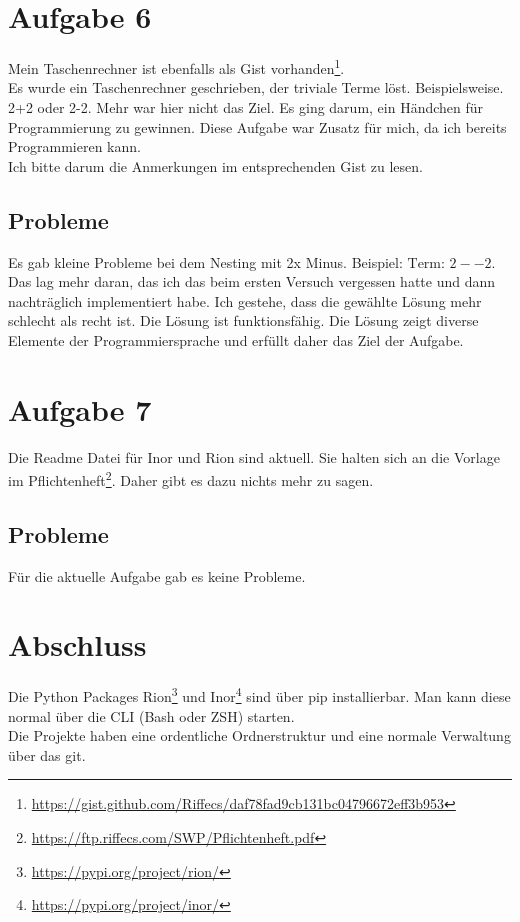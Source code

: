 \documentclass[fleqn,10pt]{olplainarticle}
\begin{document}
\section*{Aufgabe 6}
Mein Taschenrechner ist ebenfalls als Gist vorhanden\footnote{\url{https://gist.github.com/Riffecs/daf78fad9cb131bc04796672eff3b953}}. \\
Es wurde ein Taschenrechner geschrieben, der triviale Terme löst. Beispielsweise. 2+2 oder 2-2. 
Mehr war hier nicht das Ziel. Es ging darum, ein Händchen für Programmierung zu gewinnen. 
Diese Aufgabe war Zusatz für mich, da ich bereits Programmieren kann. \smiley{} \\
Ich bitte darum die Anmerkungen im entsprechenden Gist zu lesen.

\subsection*{Probleme}
Es gab kleine Probleme bei dem Nesting mit 2x Minus. Beispiel: $\text{Term: }2--2$. Das lag mehr daran, das ich das beim ersten Versuch vergessen hatte und dann nachträglich implementiert habe. Ich gestehe, dass die gewählte Lösung mehr schlecht als recht ist. Die Lösung ist funktionsfähig. Die Lösung zeigt diverse Elemente der Programmiersprache und erfüllt daher das Ziel der Aufgabe.

\cleardoublepage
\section*{Aufgabe 7}
Die Readme Datei für Inor und Rion sind aktuell. Sie halten sich an die Vorlage im Pflichtenheft\footnote{\url{https://ftp.riffecs.com/SWP/Pflichtenheft.pdf}}. Daher gibt es dazu nichts mehr zu sagen.

\subsection*{Probleme}
Für die aktuelle Aufgabe gab es keine Probleme.


\section*{Abschluss}
Die Python Packages Rion\footnote{\url{https://pypi.org/project/rion/}} und Inor\footnote{\url{https://pypi.org/project/inor/}} sind über pip installierbar. Man kann diese normal über die CLI (Bash oder ZSH) starten.\\
Die Projekte haben eine ordentliche Ordnerstruktur und eine normale Verwaltung über das git.


%
\end{document}
